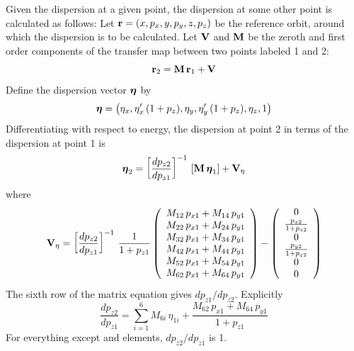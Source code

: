 Given the dispersion at a given point, the dispersion at some other point is calculated as follows:
Let ${\bf r} = (x, p_x, y, p_y, z, p_z)$ be the reference orbit, around which the dispersion is to be
calculated. Let ${\bf V}$ and $\bf M$ be the zeroth and first order components of the transfer map
between two points labeled 1 and 2:
\begin{equation}
  {\bf r}_2 = {\bf M} \, {\bf r}_1 + {\bf V}
  \label{rmrv}
\end{equation}
Define the dispersion vector $\boldsymbol{\eta}$ by
\begin{equation}
  \boldsymbol{\eta} = 
  \left( 
    \eta_x, \eta'_x \, (1 + p_z), \eta_y, \eta'_y \, (1 + p_z), \eta_z, 1
  \right)
\end{equation}
Differentiating  with respect to energy, the dispersion at point 2 in terms of the
dispersion at point 1 is
\begin{equation}
  \boldsymbol{\eta}_2 = \left[ \frac{dp_{z2}}{dp_{z1}} \right]^{-1} \, 
    \left[ {\bf M} \, \boldsymbol{\eta}_1 \right] + {\bf V}_\eta 
    \label{eppmev}
\end{equation}
where
\begin{equation}
  {\bf V}_\eta = \left[ \frac{dp_{z2}}{dp_{z1}} \right]^{-1} \, 
  \frac{1}{1 + p_{z1}}
  \left(
  \begin{array}{c}
    M_{12} \, p_{x1} + M_{14} \, p_{y1} \\
    M_{22} \, p_{x1} + M_{24} \, p_{y1} \\
    M_{32} \, p_{x1} + M_{34} \, p_{y1} \\
    M_{42} \, p_{x1} + M_{44} \, p_{y1} \\
    M_{52} \, p_{x1} + M_{54} \, p_{y1} \\
    M_{62} \, p_{x1} + M_{64} \, p_{y1} \\
  \end{array}
  \right)
  -
  \left(
  \begin{array}{c}
    0 \\
    \frac{p_{x2}}{1 + p_{z2}} \\
    0 \\
    \frac{p_{y2}}{1 + p_{z2}} \\
    0 \\
    0 
  \end{array}
  \right)
\end{equation}
The sixth row of the matrix equation gives $dp_{z1}/dp_{z2}$. 
Explicitly
\begin{equation}
  \frac{dp_{z2}}{dp_{z1}} =
  \sum_{i=1}^6 M_{6i} \, \eta_{1i} + 
  \frac{M_{62} \, p_{x1} + M_{64} \, p_{y1}}{1 + p_{z1}}
\end{equation}
For everything except  and  elements, 
$dp_{z2}/dp_{z1}$ is 1.

